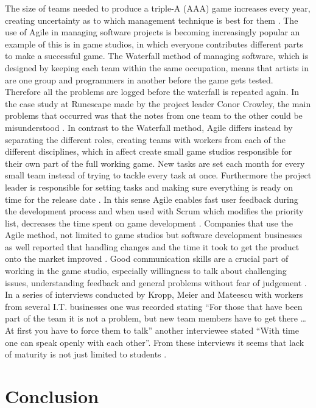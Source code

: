 \documentclass{scrartcl}
\begin{document}
The size of teams needed to produce a triple-A (AAA) game increases every year, creating uncertainty as to which management technique is best for them \cite{mateos2008adopting} \cite{mcguire2006paper}. The use of Agile in managing software projects is becoming increasingly popular\cite{one2012state} an example of this is in game studios, in which everyone contributes different parts to make a successful game. The Waterfall method of managing software, which is designed by keeping each team within the same occupation, means that  artists in are one group and programmers in another before the game gets tested. Therefore all the problems are logged before the waterfall is repeated again. In the case study at Runescape made by the project leader Conor Crowley, the main problems that occurred was that the notes from one team to the other could be misunderstood \cite{snapp2008accidental}. In contrast to the Waterfall method, Agile differs instead by separating the different roles, creating teams with workers from each of the different disciplines, which in affect create small game studios responsible for their own part of the full working game. New tasks are set each month for every small team instead of trying to tackle every task at once. Furthermore the project leader is responsible for setting tasks and making sure everything is ready on time for the release date \cite{Crowley2016GDC}. In this sense Agile enables fast user feedback during the development process and when used with Scrum which modifies the priority list, decreases the time spent on game development \cite{mateos2008adopting}. Companies that use the Agile method, not limited to game studios but software development businesses as well reported that handling changes and the time it took to get the product onto the market improved \cite{kropp2013swiss}. Good communication skills are a crucial part of working in the game studio, especially willingness to talk about challenging issues, understanding feedback and general problems without fear of judgement \cite{kropp2014teaching}. In a series of interviews conducted by Kropp, Meier and Mateescu with workers from several I.T. businesses one was recorded stating “For those that have been part of the team it is not a problem, but new team members have to get there … At first you have to force them to talk” another interviewee stated “With time one can speak openly with each other”. From these interviews it seems that lack of maturity is not just limited to students \cite{kropp2014teaching}.

\section{Conclusion}





\end{document}
